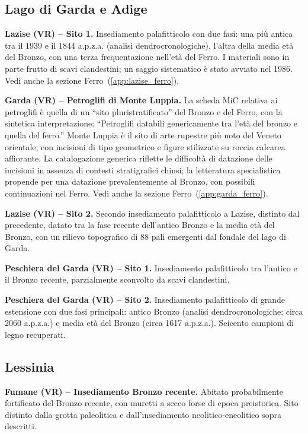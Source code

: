 \subsection{Lago di Garda e Adige}

\textbf{Lazise (VR) -- Sito 1.} \label{app:lazise1} Insediamento palafitticolo con due fasi: una più antica tra il 1939 e il 1844 a.p.z.a. (analisi dendrocronologiche), l'altra della media età del Bronzo, con una terza frequentazione nell'età del Ferro. I materiali sono in parte frutto di scavi clandestini; un saggio sistematico è stato avviato nel 1986. Vedi anche la sezione Ferro~(\ref{app:lazise_ferro}).

\textbf{Garda (VR) -- Petroglifi di Monte Luppia.} \label{app:garda_petroglifi} La scheda MiC relativa ai petroglifi è quella di un ``sito pluristratificato'' del Bronzo e del Ferro, con la sintetica interpretazione: ``Petroglifi databili genericamente tra l'età del bronzo e quella del ferro.'' Monte Luppia è il sito di arte rupestre più noto del Veneto orientale, con incisioni di tipo geometrico e figure stilizzate su roccia calcarea affiorante. La catalogazione generica riflette le difficoltà di datazione delle incisioni in assenza di contesti stratigrafici chiusi; la letteratura specialistica propende per una datazione prevalentemente al Bronzo, con possibili continuazioni nel Ferro. Vedi anche la sezione Ferro~(\ref{app:garda_ferro}).

\textbf{Lazise (VR) -- Sito 2.} Secondo insediamento palafitticolo a Lazise, distinto dal precedente, datato tra la fase recente dell'antico Bronzo e la media età del Bronzo, con un rilievo topografico di 88 pali emergenti dal fondale del lago di Garda.

\textbf{Peschiera del Garda (VR) -- Sito 1.} Insediamento palafitticolo tra l'antico e il Bronzo recente, parzialmente sconvolto da scavi clandestini.

\textbf{Peschiera del Garda (VR) -- Sito 2.} Insediamento palafitticolo di grande estensione con due fasi principali: antico Bronzo (analisi dendrocronologiche: circa 2060 a.p.z.a.) e media età del Bronzo (circa 1617 a.p.z.a.). Seicento campioni di legno recuperati.

\subsection{Lessinia}

\textbf{Fumane (VR) -- Insediamento Bronzo recente.} Abitato probabilmente fortificato del Bronzo recente, con muretti a secco forse di epoca preistorica. Sito distinto dalla grotta paleolitica e dall'insediamento neolitico-eneolitico sopra descritti.

